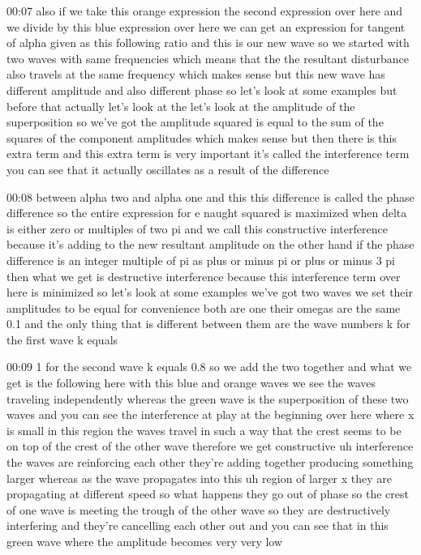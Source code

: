 00:07
also if we take this orange expression the second expression over here
and we divide by this blue expression over here
we can get an expression for tangent of alpha given as this following
ratio and this is our new wave so we started with two waves with same
frequencies which means that the the resultant disturbance also
travels at the same frequency which makes sense but this new wave has different
amplitude and also different phase so let's look at some examples but
before that actually let's look at the let's look at the
amplitude of the superposition so we've got the amplitude squared is
equal to the sum of the squares of the component amplitudes which makes sense
but then there is this extra term and this extra term is very important
it's called the interference term you can see that it actually
oscillates as a result of the difference

00:08
between alpha two and alpha one and this this difference is called the phase
difference so the entire expression for e naught
squared is maximized when delta is either zero
or multiples of two pi and we call this constructive interference because it's
adding to the new resultant amplitude on the other hand if the phase difference
is an integer multiple of pi as plus or minus pi or plus or minus 3 pi
then what we get is destructive interference because
this interference term over here is minimized
so let's look at some examples we've got two waves
we set their amplitudes to be equal for convenience both are one
their omegas are the same 0.1 and the only thing that is different
between them are the wave numbers k for the first wave k equals

00:09
1 for the second wave k equals 0.8 so we add the two together and what we get
is the following here with this blue and orange waves we see the waves traveling
independently whereas the green wave is the superposition of these two waves
and you can see the interference at play at the beginning
over here where x is small in this region
the waves travel in such a way that the crest seems to be on top of the
crest of the other wave therefore we get constructive uh interference the waves
are reinforcing each other they're adding together producing something larger
whereas as the wave propagates into this uh
region of larger x they are propagating at different
speed so what happens they go out of phase so the crest of one wave
is meeting the trough of the other wave so they are destructively interfering
and they're cancelling each other out and you can see that in this
green wave where the amplitude becomes very very low

